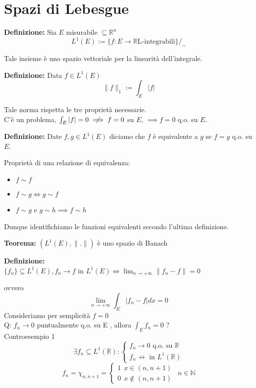 \documentclass[a4paper]{article}
\newcommand{\R}{\mathbb{R}}
\newcommand{\C}{\mathbb{C}}
\newcommand{\N}{\mathbb{N}}
\begin{document}
\section{Spazi di Lebesgue}
\begin{tcolorbox}
	\textbf{Definizione: }Sia  $E$  misurabile  $\subseteq\R^n$ 
	  \[L^1(E):= \{f:E\to  \R    \text{L-integrabili} \} /_{\sim}\]  
\end{tcolorbox}
Tale insieme è uno spazio vettoriale per la linearità dell'integrale.
\begin{tcolorbox}
	\textbf{Definizione: }Data  $f \in  L ^1(E)$ 
  \[\|f\|_1:=\int_{E}^{} |f|\]  
\end{tcolorbox}
Tale norma rispetta le tre proprietà necessarie.
\\C'è un problema,  $\int_{E}^{} |f|=0\centernot\implies f=0$  su $E$,  $\implies f=0$  q.o. su  $E$.
\begin{tcolorbox}
	\textbf{Definizione: }Date  $f,g\in  L ^1(E)$  diciamo che  $f$  è equivalente a  $g$  se  $f=g$  q.o. su  $E$.
\end{tcolorbox}
Proprietà di una relazione di equivalenza:
\begin{itemize}
	\item $f\sim f$ 
	\item $f\sim g \iff g\sim f$ 
	\item $ f\sim g$ e $g\sim h\implies f\sim h$ 
\end{itemize}
Dunque identifichiamo le funzioni equivalenti secondo l'ultima definizione.
\begin{tcolorbox}
	\textbf{Teorema: }$(L^1(E),\|.\|)$  è uno spazio di Banach
\end{tcolorbox}
\begin{tcolorbox}
	\textbf{Definizione: }\\$\{f_n\} \subseteq L^1(E),f_n\to f$ in $L^1(E) \iff \lim_{n \to +\infty} \|f_n-f\|=0$ 
\end{tcolorbox}
ovvero
\[\lim_{n\to +\infty} \int_{E}^{} |f_n-f|dx=0\] 
Consideriamo per semplicità  $f=0$ 
\\Q: $f_n\to  0$  puntualmente q.o. su  E , allora  $\int_{E}^{} f_n=0$ ? 
\\Controesempio 1
\[\exists f_n\subseteq  L^1(\R): \begin{cases}
	f_n\to 0\text{ q.o. su } \R\\
	f_n \not\to \text{ in }L^1(\R)
\end{cases}
\]
\[f_n=\chi_{n, n+1}=\begin{cases}
	1\ \ x\in(n,n+1)
	\\0\ \ x \not\in (n,n+1)
\end{cases}\ \ n\in \N
\]
\end{document}
